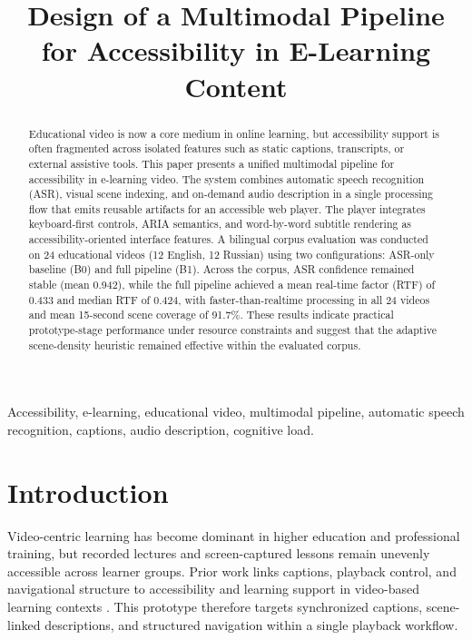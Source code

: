 \documentclass[conference]{IEEEtran}
\begin{document}
\title{Design of a Multimodal Pipeline for Accessibility in E-Learning Content}

\author{
}

\maketitle

\begin{abstract}
Educational video is now a core medium in online learning, but accessibility support is often fragmented across isolated features such as static captions, transcripts, or external assistive tools. This paper presents a unified multimodal pipeline for accessibility in e-learning video. The system combines automatic speech recognition (ASR), visual scene indexing, and on-demand audio description in a single processing flow that emits reusable artifacts for an accessible web player. The player integrates keyboard-first controls, ARIA semantics, and word-by-word subtitle rendering as accessibility-oriented interface features. A bilingual corpus evaluation was conducted on 24 educational videos (12 English, 12 Russian) using two configurations: ASR-only baseline (B0) and full pipeline (B1). Across the corpus, ASR confidence remained stable (mean 0.942), while the full pipeline achieved a mean real-time factor (RTF) of 0.433 and median RTF of 0.424, with faster-than-realtime processing in all 24 videos and mean 15-second scene coverage of 91.7\%. These results indicate practical prototype-stage performance under resource constraints and suggest that the adaptive scene-density heuristic remained effective within the evaluated corpus.

\end{abstract}

\begin{IEEEkeywords}
Accessibility, e-learning, educational video, multimodal pipeline, automatic speech recognition, captions, audio description, cognitive load.
\end{IEEEkeywords}

\section{Introduction}
Video-centric learning has become dominant in higher education and professional training, but recorded lectures and screen-captured lessons remain unevenly accessible across learner groups. Prior work links captions, playback control, and navigational structure to accessibility and learning support in video-based learning contexts \cite{Gernsbacher2015,Mayer2020,Horlin2024,WCAG21}. This prototype therefore targets synchronized captions, scene-linked descriptions, and structured navigation within a single playback workflow.
\end{document}
